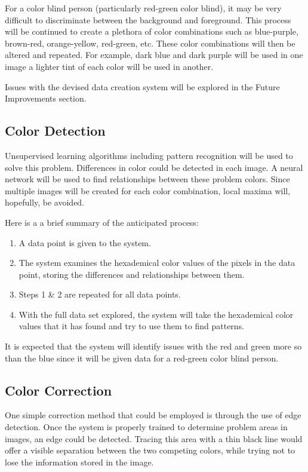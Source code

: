 \documentclass[12pt]{article}
\begin{document}
For a color blind person (particularly red-green color blind), it may be very difficult to discriminate between the background and foreground. This process will be continued to create a plethora of color combinations such as blue-purple, brown-red, orange-yellow, red-green, etc. These color combinations will then be altered and repeated. For example, dark blue and dark purple will be used in one image a lighter tint of each color will be used in another.

Issues with the devised data creation system will be explored in the Future Improvements section.

\subsection{Color Detection}
Unsupervised learning algorithms including pattern recognition will be used to solve this problem. Differences in color could be detected in each image. A neural network will be used to find relationships between these problem colors.
Since multiple images will be created for each color combination, local maxima will, hopefully, be avoided. 

Here is a a brief summary of the anticipated process:
\begin{enumerate}
\item A data point is given to the system.
\item The system examines the hexademical color values of the pixels in the data point, storing the differences and relationships between them.
\item Steps 1 \& 2 are repeated for all data points.
\item With the full data set explored, the system will take the hexademical color values that it has found and try to use them to find patterns.
\end{enumerate}

It is expected that the system will identify issues with the red and green more so than the blue since it will be given data for a red-green color blind person.

\subsection{Color Correction}

One simple correction method that could be employed is through the use of edge detection. Once the system is properly trained to determine problem areas in images, an edge could be detected. Tracing this area with a thin black line would offer a visible separation between the two competing colors, while trying not to lose the information stored in the image.
\end{document}
